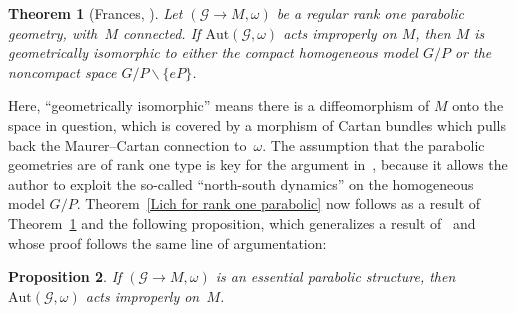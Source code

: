 \documentclass[pdftex]{sigma}
\def\Gbdle{\mathcal{G}}
\theoremstyle{plain}
\newtheorem{Theorem}{Theorem}[section]
\newtheorem{Proposition}[Theorem]{Proposition}
\theoremstyle{definition}
\begin{document}
\begin{Theorem}[Frances, \cite{Frances}]  \label{Frances thm}Let $(\Gbdle \rightarrow M,\omega)$ be a regular rank one parabolic geometry, with~$M$ connected. If $\mathrm{Aut}(\Gbdle,\omega)$ acts improperly on $M$, then $M$ is geometrically isomorphic to either the compact homogeneous model $G/P$ or the noncompact space $G/P \backslash \{eP\}$.
\end{Theorem}

Here, ``geometrically isomorphic'' means there is a dif\/feomorphism of $M$ onto the space in question, which is covered by a morphism of Cartan bundles which pulls back the Maurer--Cartan connection to~$\omega$. The assumption that the parabolic geometries are of rank one type is key for the argument in~\cite{Frances}, because it allows the author to exploit the so-called ``north-south dynamics'' on the homogeneous model $G/P$. Theorem~\ref{Lich for rank one parabolic} now follows as a result of Theorem~\ref{Frances thm} and the following proposition, which generalizes a result of~\cite{Aleks} and whose proof follows the same line of argumentation:

\begin{Proposition} \label{proper implies inessential} If $(\Gbdle \rightarrow M,\omega)$ is an essential parabolic structure, then $\mathrm{Aut}(\Gbdle,\omega)$ acts improperly on~$M$.
\end{Proposition}
\end{document}
